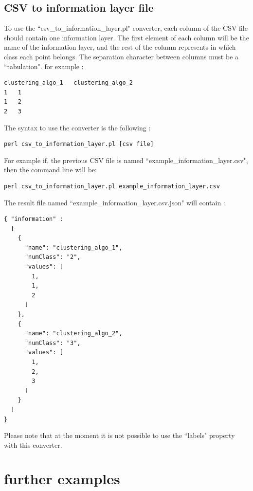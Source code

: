 \documentclass{bioinfo}
\begin{document}
\subsection{CSV to information layer file}
To use the ``csv\_to\_information\_layer.pl" converter, each column of the CSV file should contain one information layer. The first element of each column will be the name of the information layer, and the rest of the column represents in which class each point belongs. The separation character between columns must be a ``tabulation". for example :
\begin{lstlisting}
clustering_algo_1	clustering_algo_2
1	1
1	2
2	3
\end{lstlisting}
The syntax to use the converter is the following :
\begin{lstlisting}
perl csv_to_information_layer.pl [csv file]
\end{lstlisting}
For example if, the previous CSV file is named ``example\_information\_layer.csv", then the command line will be:
\begin{lstlisting}
perl csv_to_information_layer.pl example_information_layer.csv
\end{lstlisting}
The result file named ``example\_information\_layer.csv.json" will contain :
\begin{lstlisting}
{ "information" :
  [
    {
      "name": "clustering_algo_1",
      "numClass": "2",
      "values": [
        1,
        1,
        2
      ]
    },
    {
      "name": "clustering_algo_2",
      "numClass": "3",
      "values": [
        1,
        2,
        3
      ]
    }
  ]
}
\end{lstlisting}
Please note that at the moment it is not possible to use the ``labels" property with this converter. 
\section{further examples}
\end{document}
